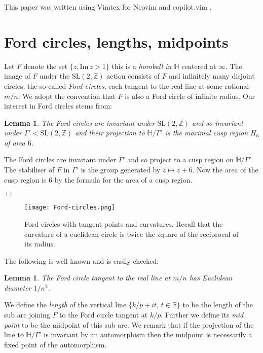 \documentclass[12pt,a4paper]{amsart}
\newtheorem{lem}[thm]{Lemma}
\def\HH{\mathbb{H}}
\def\im{\mathrm{Im}\,}
\def\xx{\HH/\Gamma'}
\def\ZZ{\mathbb{Z}}
\def\RR{\mathbb{R}}
\def\sl2{\mathrm{SL}(2, \ZZ)}
\begin{document}
This paper was written using Vimtex for Neovim and copilot.vim .



\section{Ford circles, lengths, midpoints} 
\label{lengths}

Let $F$ denote the set  $\{ z, \im z > 1\}$ this is a \textit{horoball in
$\HH$} centered at $\infty$. The image of $F$ under the $\sl2$ action consists
of $F$ and infinitely many disjoint circles, the so-called \textit{Ford
circles}, each tangent to the real line at some rational $m/n$. We adopt the
convention that $F$ is also a Ford circle of infinite radius. Our interest in
Ford circles stems from:

\begin{lem} 

	The Ford circles are invariant under $\sl2$ and so invariant under
	$\Gamma'< \sl2$ and their projection to $\xx$ is the maximal cusp
	region $H_6$ of area $6$. 

\end{lem}

\proof
The Ford circles are invariant under $\Gamma'$ and so project to a cusp
region on $\xx$. The stabiliser of $F$ in $\Gamma'$ is the group generated by
$z \mapsto z + 6$. Now the area of the cusp region is $6$ by the formula for
the area of a cusp region. 

\hfill $\Box$

\begin{figure}[ht]
\begin{center}
\texttt{[image: Ford-circles.png]} 
\end{center}
\caption{Ford circles with tangent points and curvatures.
Recall that the curvature of a euclidean circle is twice  the square of  the reciprocal of its radius.}
\end{figure}

The following is well known and is easily checked:

\begin{lem}\label{ford}
The Ford circle tangent to the real line at $m/n$
has Euclidean diameter $1/n^2$.
\end{lem}


We define the \textit{length} of the vertical line 
$\{ k/p + i t,\, t \in \RR \}$
to be the length of the  sub arc joining 
$F$ to the Ford circle tangent at $k/p$.
Further we define its  \textit{mid point} to be the midpoint of this sub arc.
We remark that if the projection of the line to $\xx$
is invariant by an automorphism 
then the midpoint is necessarily a fixed point of the automorphism.
\end{document}
